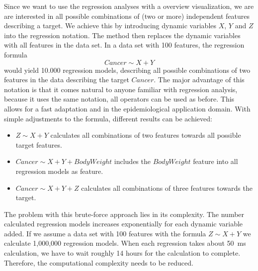 \documentclass[journal]{style/vgtc} 			          %
\newcommand{\com}[1]{\textcolor{orange}{\uline{#1}}}
\begin{document}
Since we want to use the regression analyses with a overview visualization, we are are interested in all possible combinations of (two or more) independent features describing a target.
We achieve this by introducing dynamic variables $X$, $Y$ and $Z$ into the regression notation.
The method then replaces the dynamic variables with all features in the data set.
In a data set with 100 features, the regression formula
\begin{equation}
Cancer \sim X + Y
\end{equation}
would yield 10.000 regression models, describing all possible combinations of two features in the data describing the target $Cancer$.
The major advantage of this notation is that it comes natural to anyone familiar with regression analysis, because it uses the same notation, all operators can be used as before.
This allows for a fast adaptation and in the epidemiological application domain.
With simple adjustments to the formula, different results can be achieved:
\begin{itemize}
	\item $Z \sim X + Y$ calculates all combinations of two features towards all possible target features.
	\item $Cancer \sim X + Y + BodyWeight$ includes the $BodyWeight$ feature into all regression models as feature.
	\item $Cancer \sim X + Y + Z$ calculates all combinations of three features towards the target.
\end{itemize}
The problem with this brute-force approach lies in its complexity.
The number calculated regression models increases exponentially for each dynamic variable added.
If we assume a data set with 100 features with the formula $Z \sim X + Y$ we calculate 1,000,000 regression models.
When each regression takes about 50~ms calculation, we have to wait roughly 14 hours for the calculation to complete.
Therefore, the computational complexity needs to be reduced.
\end{document}
